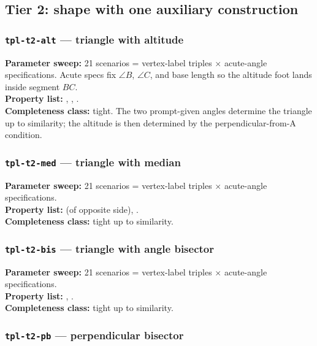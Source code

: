 \subsection{Tier 2: shape with one auxiliary construction}

\subsubsection{\texttt{tpl-t2-alt} --- triangle with altitude}

\textbf{Parameter sweep:} 21 scenarios = vertex-label triples $\times$ acute-angle specifications. Acute specs fix $\angle B$, $\angle C$, and base length so the altitude foot lands inside segment $BC$.\\
\textbf{Property list:} , , .\\
\textbf{Completeness class:} tight. The two prompt-given angles determine the triangle up to similarity; the altitude is then determined by the perpendicular-from-A condition.

\subsubsection{\texttt{tpl-t2-med} --- triangle with median}

\textbf{Parameter sweep:} 21 scenarios = vertex-label triples $\times$ acute-angle specifications.\\
\textbf{Property list:}  (of opposite side), .\\
\textbf{Completeness class:} tight up to similarity.

\subsubsection{\texttt{tpl-t2-bis} --- triangle with angle bisector}

\textbf{Parameter sweep:} 21 scenarios = vertex-label triples $\times$ acute-angle specifications.\\
\textbf{Property list:} , .\\
\textbf{Completeness class:} tight up to similarity.

\subsubsection{\texttt{tpl-t2-pb} --- perpendicular bisector}

